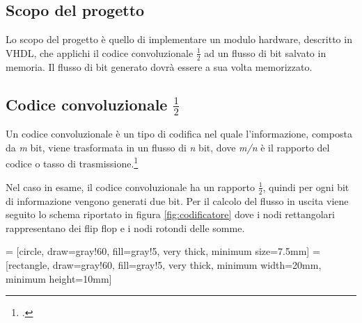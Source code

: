 \subsection{Scopo del progetto}

Lo scopo del progetto è quello di implementare un modulo hardware, descritto in VHDL, che applichi il codice convoluzionale $\frac{1}{2}$ ad un flusso di bit salvato in memoria. Il flusso di bit generato dovrà essere a sua volta memorizzato.

\subsection{Codice convoluzionale $\frac{1}{2}$}

Un codice convoluzionale è un tipo di codifica nel quale l'informazione, composta da \textit{m} bit, viene trasformata in un flusso di \textit{n} bit, dove \textit{m/n} è il rapporto del codice o tasso di trasmissione.\footcite{codiceconvoluzionale}

Nel caso in esame, il codice convoluzionale ha un rapporto $\frac{1}{2}$, quindi per ogni bit di informazione vengono generati due bit. Per il calcolo del flusso in uscita viene seguito lo schema riportato in figura \ref{fig:codificatore} dove i nodi rettangolari rappresentano dei flip flop e i nodi rotondi delle somme.

 = [circle, draw=gray!60, fill=gray!5, very thick, minimum size=7.5mm]
 = [rectangle, draw=gray!60, fill=gray!5, very thick, minimum width=20mm, minimum height=10mm]

